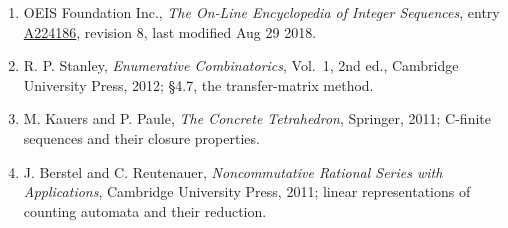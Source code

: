\documentclass[11pt]{article}
\theoremstyle{definition}
\begin{document}
\begin{enumerate}

\item OEIS Foundation Inc., \emph{The On-Line Encyclopedia of Integer Sequences}, entry \href{https://oeis.org/A224186}{A224186}, revision 8, last modified Aug 29 2018.

\item R. P. Stanley, \emph{Enumerative Combinatorics}, Vol.~1, 2nd ed., Cambridge University Press, 2012; \S4.7, the transfer-matrix method.

\item M. Kauers and P. Paule, \emph{The Concrete Tetrahedron}, Springer, 2011; C-finite sequences and their closure properties.

\item J. Berstel and C. Reutenauer, \emph{Noncommutative Rational Series with Applications}, Cambridge University Press, 2011; linear representations of counting automata and their reduction.

\end{enumerate}
\end{document}
